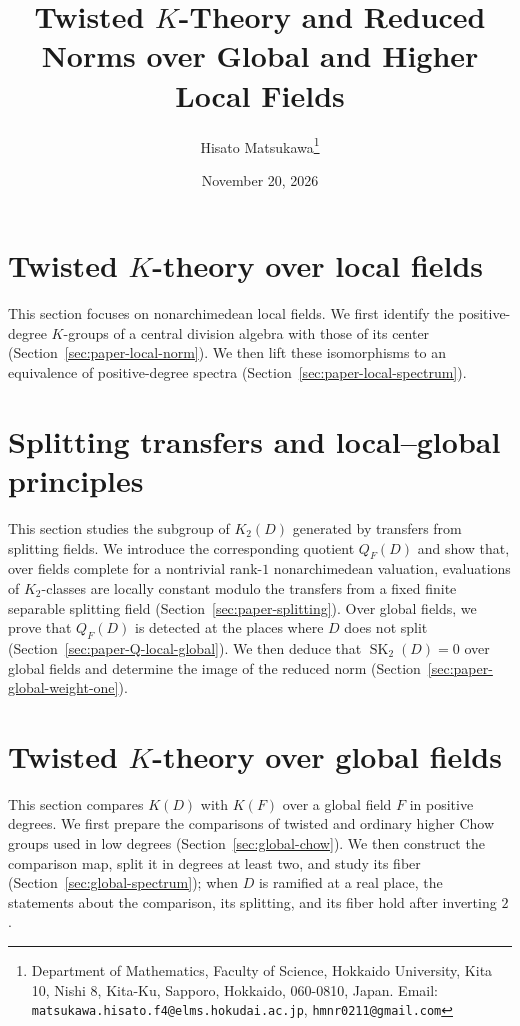 \documentclass[a4paper,11pt]{article}
\title{Twisted \texorpdfstring{$K$}{K}-Theory and Reduced Norms over Global and Higher Local Fields}
\author{Hisato Matsukawa\thanks{Department of Mathematics, Faculty of Science, Hokkaido University, Kita 10, Nishi 8, Kita-Ku, Sapporo, Hokkaido, 060-0810, Japan. Email: \texttt{matsukawa.hisato.f4@elms.hokudai.ac.jp}, \texttt{hmnr0211@gmail.com}}}
\date{November 20, 2026}
\theoremstyle{plain}
\theoremstyle{definition}
\theoremstyle{remark}
\theoremstyle{plain}
\DeclareMathOperator{\SK}{SK}
\begin{document}
\maketitle

\tableofcontents




\section{Twisted \texorpdfstring{$K$}{K}-theory over local fields}\label{sec:local}
This section focuses on nonarchimedean local fields.
We first identify the positive-degree $K$-groups of a central division algebra with those of its center (Section~\ref{sec:paper-local-norm}).
We then lift these isomorphisms to an equivalence of positive-degree spectra (Section~\ref{sec:paper-local-spectrum}).


\section{Splitting transfers and local--global principles}\label{sec:splitting-transfers}
This section studies the subgroup of $K_2(D)$ generated by transfers from splitting fields.
We introduce the corresponding quotient $Q_F(D)$ and show that, over fields complete for a nontrivial rank-$1$ nonarchimedean valuation, evaluations of $K_2$-classes are locally constant modulo the transfers from a fixed finite separable splitting field (Section~\ref{sec:paper-splitting}).
Over global fields, we prove that $Q_F(D)$ is detected at the places where $D$ does not split (Section~\ref{sec:paper-Q-local-global}).
We then deduce that $\SK_2(D)=0$ over global fields and determine the image of the reduced norm (Section~\ref{sec:paper-global-weight-one}).



\section{Twisted \texorpdfstring{$K$}{K}-theory over global fields}\label{sec:global}
This section compares $K(D)$ with $K(F)$ over a global field $F$ in positive degrees.
We first prepare the comparisons of twisted and ordinary higher Chow groups used in low degrees (Section~\ref{sec:global-chow}).
We then construct the comparison map, split it in degrees at least two, and study its fiber (Section~\ref{sec:global-spectrum}); when $D$ is ramified at a real place, the statements about the comparison, its splitting, and its fiber hold after inverting $2$.


\end{document}
